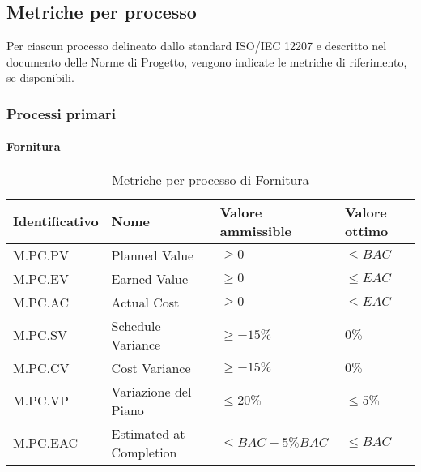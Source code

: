 \subsection{Metriche per processo}
\label{subsec:processi_metriche}
Per ciascun processo delineato dallo standard ISO/IEC 12207 e descritto nel documento delle Norme di Progetto, 
vengono indicate le metriche di riferimento, se disponibili.

\subsubsection{Processi primari}
\paragraph{Fornitura}
\begin{table}[H]
    \centering
    \begin{tabular}{| l | l | l | l |}
    \hline
    \textbf{Identificativo} & 
    \textbf{Nome} &
    \textbf{Valore ammissible} &
    \textbf{Valore ottimo}\\
    \hline
        M.PC.PV & Planned Value & $\geq 0$ & $\leq BAC$ \\
    \hline
        M.PC.EV & Earned Value & $\geq 0$ & $\leq EAC$ \\
    \hline
        M.PC.AC & Actual Cost & $\geq 0$ & $\leq EAC$ \\
    \hline
        M.PC.SV & Schedule Variance & $\geq -15\%$ & $0\%$ \\
    \hline
        M.PC.CV & Cost Variance & $\geq -15\%$ & $0\%$ \\
    \hline  
        M.PC.VP & Variazione del Piano & $\leq 20\%$ & $\leq 5\%$ \\
    \hline
        M.PC.EAC & Estimated at Completion & $\leq BAC+5\% BAC$ & $\leq BAC$ \\
    \hline
\end{tabular}
\caption{Metriche per processo di Fornitura}
\label{tab:metriche_fornitura} 
\end{table}

